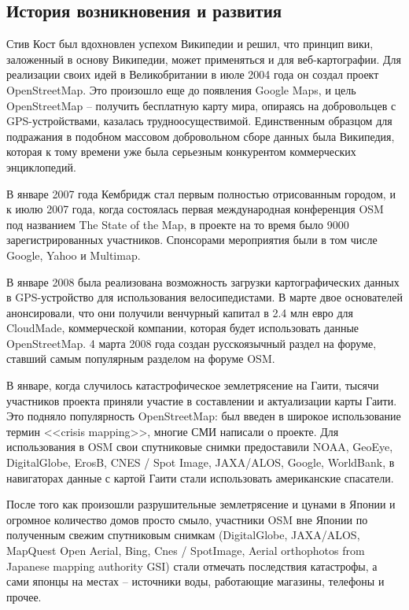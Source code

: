 \subsection{История возникновения и развития}
Стив Кост был вдохновлен успехом Википедии и решил, что принцип вики, 
заложенный в основу Википедии, может применяться и для веб-картографии. Для 
реализации своих идей в Великобритании в июле 2004 года он создал проект 
OpenStreetMap. Это произошло еще до появления Google Maps, и цель 
OpenStreetMap -- получить бесплатную карту мира, опираясь на добровольцев с 
GPS-устройствами, казалась трудноосуществимой. Единственным образцом для 
подражания в подобном массовом добровольном сборе данных была Википедия, 
которая к тому времени уже была серьезным конкурентом коммерческих 
энциклопедий.

В январе 2007 года Кембридж стал первым полностью отрисованным городом, и к 
июлю 2007 года, когда состоялась первая международная конференция OSM под 
названием The State of the Map, в проекте на то время было 9000 
зарегистрированных участников. Спонсорами мероприятия были в том числе Google, 
Yahoo и Multimap.

В январе 2008 была реализована возможность загрузки картографических данных в 
GPS-устройство для использования велосипедистами. В марте двое основателей
анонсировали, что они получили венчурный капитал в 2.4 млн евро для CloudMade,
коммерческой компании, которая будет использовать данные OpenStreetMap.
4 марта 2008 года создан русскоязычный раздел на форуме, ставший самым
популярным разделом на форуме OSM.

В январе, когда случилось катастрофическое землетрясение на Гаити, тысячи 
участников проекта приняли участие в составлении и актуализации карты Гаити. 
Это подняло популярность OpenStreetMap: был введен в широкое использование 
термин <<crisis mapping>>, многие СМИ написали о проекте. Для использования в 
OSM свои спутниковые снимки предоставили NOAA, GeoEye, DigitalGlobe, ErosB, 
CNES / Spot Image, JAXA/ALOS, Google, WorldBank, в навигаторах данные с картой 
Гаити стали использовать американские спасатели.

После того как произошли разрушительные землетрясение и цунами в Японии и 
огромное количество домов просто смыло, участники OSM вне Японии по полученным 
свежим спутниковым снимкам (DigitalGlobe, JAXA/ALOS, MapQuest Open Aerial, 
Bing, Cnes / SpotImage, Aerial orthophotos from Japanese mapping authority 
GSI) стали отмечать последствия катастрофы, а сами японцы на местах -- 
источники воды, работающие магазины, телефоны и прочее.\cite{osmwiki}

